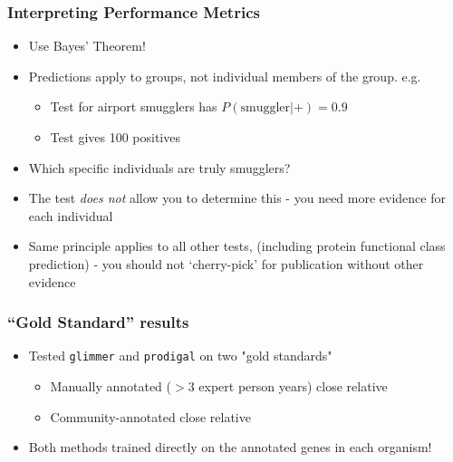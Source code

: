 \documentclass[table]{beamer}
\begin{document}
    \begin{frame}
     \frametitle{Interpreting Performance Metrics}
     \begin{itemize}
       \item<1-> Use Bayes' Theorem!
       \item<1-> Predictions apply to groups, not individual members of the group. e.g.
       \begin{itemize}
         \item Test for airport smugglers has $P(\text{smuggler}|+) = 0.9$
         \item Test gives 100 positives
       \end{itemize}
       \item<1-> Which specific individuals are truly smugglers?
       \item<2-> The test \emph{does not} allow you to determine this - you need more evidence for each individual
       \item<2->  Same principle applies to all other tests, (including protein functional class prediction) - you should not `cherry-pick' for publication without other evidence
     \end{itemize} 
   \end{frame}

    \begin{frame}
     \frametitle{``Gold Standard'' results}
     \begin{itemize}
       \item Tested \texttt{glimmer} and \texttt{prodigal} on two "gold standards"
       \begin{itemize}
         \item Manually annotated ($>$3 expert person years) close relative
         \item Community-annotated close relative
       \end{itemize}
       \item Both methods trained directly on the annotated genes in each organism!
     \end{itemize} 
   \end{frame}
\end{document}
